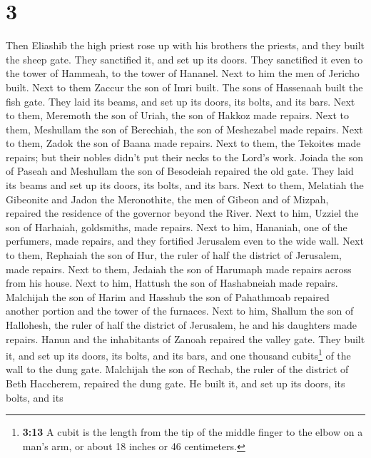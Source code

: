 \hypertarget{section-2}{%
\section{3}\label{section-2}}

 Then Eliashib the high priest rose up with his brothers
the priests, and they built the sheep gate. They sanctified it, and set
up its doors. They sanctified it even to the tower of Hammeah, to the
tower of Hananel.  Next to him the men of Jericho built.
Next to them Zaccur the son of Imri built.  The sons of
Hassenaah built the fish gate. They laid its beams, and set up its
doors, its bolts, and its bars.  Next to them, Meremoth
the son of Uriah, the son of Hakkoz made repairs. Next to them,
Meshullam the son of Berechiah, the son of Meshezabel made repairs. Next
to them, Zadok the son of Baana made repairs.  Next to
them, the Tekoites made repairs; but their nobles didn't put their necks
to the Lord's work.  Joiada the son of Paseah and
Meshullam the son of Besodeiah repaired the old gate. They laid its
beams and set up its doors, its bolts, and its bars.  Next
to them, Melatiah the Gibeonite and Jadon the Meronothite, the men of
Gibeon and of Mizpah, repaired the residence of the governor beyond the
River.  Next to him, Uzziel the son of Harhaiah,
goldsmiths, made repairs. Next to him, Hananiah, one of the perfumers,
made repairs, and they fortified Jerusalem even to the wide wall.
 Next to them, Rephaiah the son of Hur, the ruler of half
the district of Jerusalem, made repairs.  Next to them,
Jedaiah the son of Harumaph made repairs across from his house. Next to
him, Hattush the son of Hashabneiah made repairs. 
Malchijah the son of Harim and Hasshub the son of Pahathmoab repaired
another portion and the tower of the furnaces.  Next to
him, Shallum the son of Hallohesh, the ruler of half the district of
Jerusalem, he and his daughters made repairs.  Hanun and
the inhabitants of Zanoah repaired the valley gate. They built it, and
set up its doors, its bolts, and its bars, and one thousand
cubits\footnote{\textbf{3:13} A cubit is the length from the tip of the
  middle finger to the elbow on a man's arm, or about 18 inches or 46
  centimeters.} of the wall to the dung gate.  Malchijah
the son of Rechab, the ruler of the district of Beth Haccherem, repaired
the dung gate. He built it, and set up its doors, its bolts, and its
